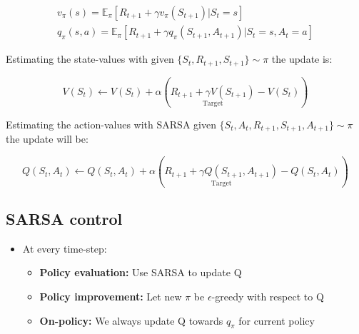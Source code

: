 	\begin{equation}
	\begin{aligned}
		 		v_\pi(s) = \mathbb{E}_\pi[R_{t+1} + \gamma v_\pi(S_{t+1})|S_t =s] \\
		 		q_\pi(s,a) = \mathbb{E}_\pi[R_{t+1}+ \gamma q_\pi(S_{t+1}, A_{t+1}) | S_t = s, A_t = a]
	\end{aligned}
	\end{equation}

Estimating the state-values with given $\{ S_t, R_{t+1},S_{t+1}\} \sim \pi$ the update is:

	\begin{equation}
		V(S_t) \leftarrow V(S_t) + \alpha (\underset{\text{Target}}{R_{t+1}+\gamma V(S_{t+1}) }- V(S_t))  
	\end{equation}  

Estimating the action-values with SARSA given $\{S_t,A_t,R_{t+1},S_{t+1},A_{t+1}\} \sim \pi$ the update will be:

	\begin{equation}
		Q(S_t,A_t) \leftarrow Q(S_t,A_t) + \alpha (\underset{\text{Target}}{R_{t+1} + \gamma Q(S_{t+1},A_{t+1})}-Q(S_t,A_t))
	\end{equation}

\subsection*{SARSA control}

\begin{itemize}
	\item At every time-step:
	\begin{itemize}
	\item \textbf{Policy evaluation: } Use SARSA to update Q
	\item \textbf{Policy improvement: } Let new $\pi$ be $\epsilon$-greedy with respect to Q
	\item \textbf{On-policy: } We always update Q towards $q_\pi$ for current policy
\end{itemize}
\end{itemize}


